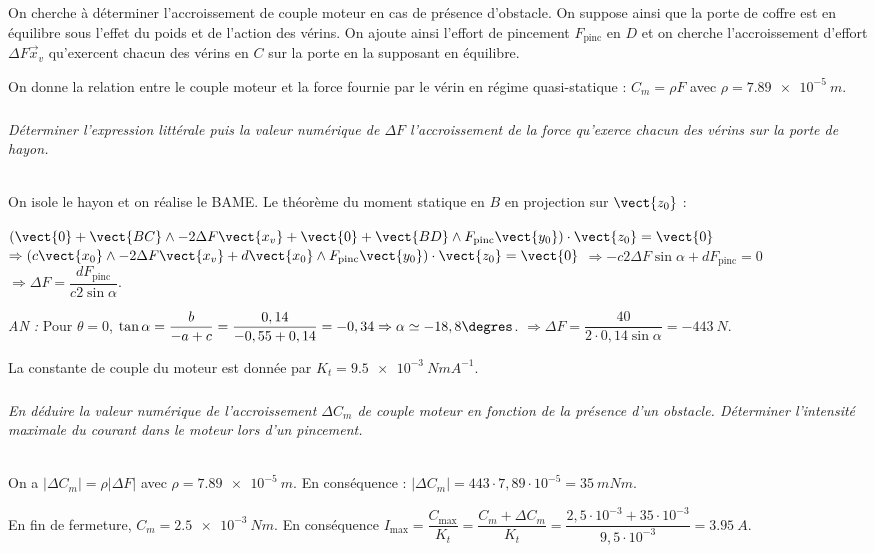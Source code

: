 On cherche à déterminer l’accroissement de couple moteur en cas de présence d’obstacle. On suppose ainsi que la
porte de coffre est en équilibre sous l’effet du poids et de l’action des vérins. On ajoute ainsi l’effort de pincement
$ F_{\text{pinc}}$ en $D$ et on cherche l’accroissement d’effort $\Delta F\vec{x}_v$ qu’exercent chacun des vérins en $C$ sur la porte en la supposant en équilibre.

On donne la relation entre le couple moteur et la force fournie par le vérin en régime quasi-statique : $C_m=\rho F$ avec $\rho=\SI{7,89e-5}{m}$.

\fi


\subparagraph{}
\textit{Déterminer l’expression littérale puis la valeur
numérique de $\Delta F$ l’accroissement de la force qu’exerce chacun des vérins sur la porte de hayon.}
\ifprof
\begin{corrige}~\\
On isole le hayon et on réalise le BAME. Le théorème du moment statique en $B$ en projection sur $\vect{z_0}$ : 

$ \left( 
\vect{0} + \vect{BC}\wedge -2\Delta F \vect{x_v}
+ \vect{0} + \vect{BD}\wedge F_{\text{pinc}}\vect{y_0}
\right) \cdot \vect {z_0} = \vect{0} $
$\Rightarrow \left( 
c\vect{x_0}\wedge -2\Delta F \vect{x_v}
+ d\vect{x_0}\wedge F_{\text{pinc}}\vect{y_0}
\right) \cdot \vect {z_0} = \vect{0}$
$\Rightarrow  
-c 2\Delta F  \sin \alpha + dF_{\text{pinc}}  = {0} $
$\Rightarrow  
\Delta F  = \dfrac{dF_{\text{pinc}}}{c 2  \sin \alpha}  $. 

\textit{AN :}
Pour $\theta=0$, $ \tan \alpha = \dfrac{b}{-a+c}=\dfrac{0,14}{-0,55+0,14}=-0,34 \Rightarrow \alpha \simeq -18,8 \degres$.
$\Rightarrow  
\Delta F  = \dfrac{40}{2\cdot 0,14  \sin \alpha} = \SI{-443}{N} $.
\end{corrige}
\else

\fi

La constante de couple du moteur est donnée par $K_t = \SI{9,5e-3}{NmA^{-1}}$.

\subparagraph{}
\textit{En déduire la valeur numérique de l’accroissement $\Delta C_m$  de couple moteur en fonction de la présence d’un obstacle. Déterminer l’intensité maximale du courant dans le moteur lors d’un pincement.}%
\ifprof
\begin{corrige}~\\
On a $\left|\Delta C_m\right|=\rho \left|\Delta F \right|$ avec $\rho=\SI{7,89e-5}{m}$. En conséquence : $\left|\Delta C_m\right|=443 \cdot 7,89 \cdot 10^{-5} = \SI{35}{mNm}$.

En fin de fermeture, $C_m=\SI{2,5e-3}{Nm}$.
En conséquence $I_{\text{max}}=\dfrac{C_{\text{max}}}{K_t}=\dfrac{C_{m}+\Delta C_m}{K_t}=\dfrac{2,5\cdot 10^{-3}+35\cdot 10^{-3}}{9,5\cdot 10^{-3}}=\SI{3,95}{A}$.

\end{corrige}
\else
\fi

